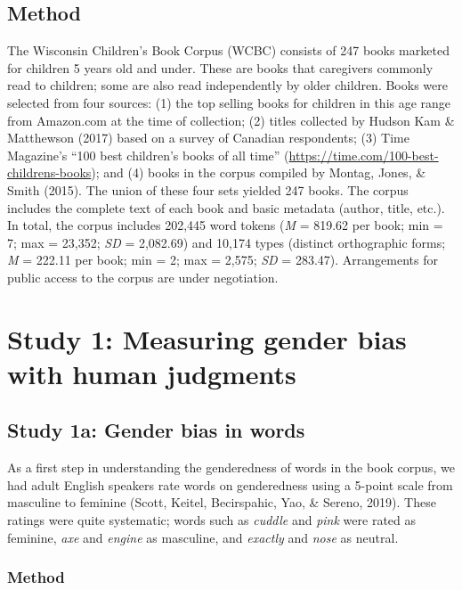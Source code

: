 \documentclass[
  english,
  ,man,floatsintext]{apa6}
\begin{document}
\hypertarget{method}{%
\subsection{Method}\label{method}}

The Wisconsin Children's Book Corpus (WCBC) consists of 247 books marketed for children 5 years old and under. These are books that caregivers commonly read to children; some are also read independently by older children. Books were selected from four sources: (1) the top selling books for children in this age range from Amazon.com at the time of collection; (2) titles collected by Hudson Kam \& Matthewson (2017) based on a survey of Canadian respondents; (3) Time Magazine's \enquote{100 best children's books of all time} (\url{https://time.com/100-best-childrens-books}); and (4) books in the corpus compiled by Montag, Jones, \& Smith (2015). The union of these four sets yielded 247 books. The corpus includes the complete text of each book and basic metadata (author, title, etc.). In total, the corpus includes 202,445 word tokens (\emph{M} = 819.62 per book; min = 7; max = 23,352; \emph{SD} = 2,082.69) and 10,174 types (distinct orthographic forms; \emph{M} = 222.11 per book; min = 2; max = 2,575; \emph{SD} = 283.47). Arrangements for public access to the corpus are under negotiation.

\hypertarget{study-1-measuring-gender-bias-with-human-judgments}{%
\section{Study 1: Measuring gender bias with human judgments}\label{study-1-measuring-gender-bias-with-human-judgments}}

\hypertarget{study-1a-gender-bias-in-words}{%
\subsection{Study 1a: Gender bias in words}\label{study-1a-gender-bias-in-words}}

As a first step in understanding the genderedness of words in the book corpus, we had adult English speakers rate words on genderedness using a 5-point scale from masculine to feminine (Scott, Keitel, Becirspahic, Yao, \& Sereno, 2019). These ratings were quite systematic; words such as \emph{cuddle} and \emph{pink} were rated as feminine, \emph{axe} and \emph{engine} as masculine, and \emph{exactly} and \emph{nose} as neutral.

\hypertarget{method-1}{%
\subsubsection{Method}\label{method-1}}
\end{document}
